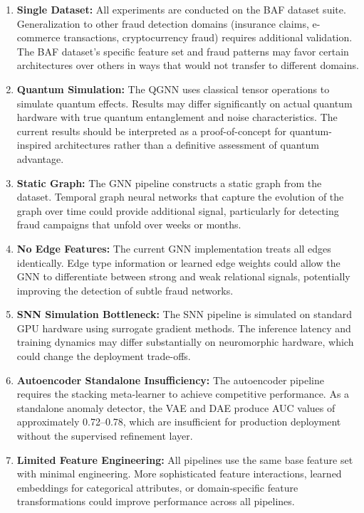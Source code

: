 \begin{enumerate}[label=\arabic*.]
\item \textbf{Single Dataset:} All experiments are conducted on the BAF dataset suite. Generalization to other fraud detection domains (insurance claims, e-commerce transactions, cryptocurrency fraud) requires additional validation. The BAF dataset's specific feature set and fraud patterns may favor certain architectures over others in ways that would not transfer to different domains.

\item \textbf{Quantum Simulation:} The QGNN uses classical tensor operations to simulate quantum effects. Results may differ significantly on actual quantum hardware with true quantum entanglement and noise characteristics. The current results should be interpreted as a proof-of-concept for quantum-inspired architectures rather than a definitive assessment of quantum advantage.

\item \textbf{Static Graph:} The GNN pipeline constructs a static graph from the dataset. Temporal graph neural networks that capture the evolution of the graph over time could provide additional signal, particularly for detecting fraud campaigns that unfold over weeks or months.

\item \textbf{No Edge Features:} The current GNN implementation treats all edges identically. Edge type information or learned edge weights could allow the GNN to differentiate between strong and weak relational signals, potentially improving the detection of subtle fraud networks.

\item \textbf{SNN Simulation Bottleneck:} The SNN pipeline is simulated on standard GPU hardware using surrogate gradient methods. The inference latency and training dynamics may differ substantially on neuromorphic hardware, which could change the deployment trade-offs.

\item \textbf{Autoencoder Standalone Insufficiency:} The autoencoder pipeline requires the stacking meta-learner to achieve competitive performance. As a standalone anomaly detector, the VAE and DAE produce AUC values of approximately 0.72--0.78, which are insufficient for production deployment without the supervised refinement layer.

\item \textbf{Limited Feature Engineering:} All pipelines use the same base feature set with minimal engineering. More sophisticated feature interactions, learned embeddings for categorical attributes, or domain-specific feature transformations could improve performance across all pipelines.


\end{enumerate}
